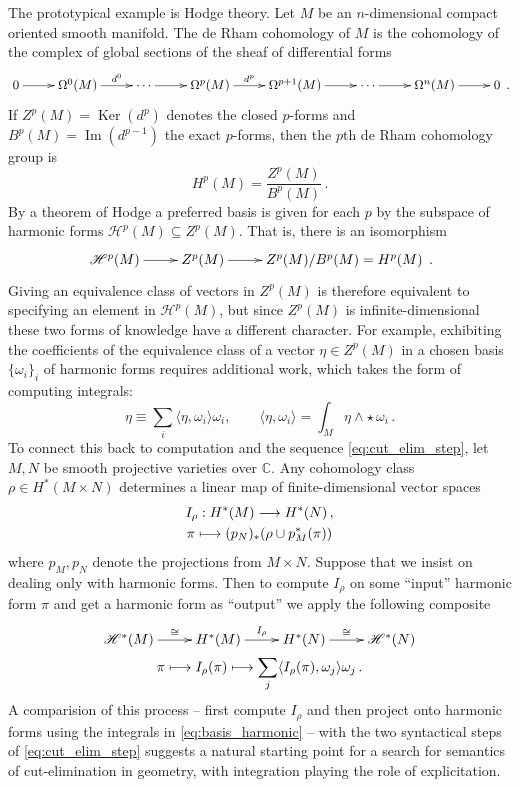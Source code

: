 \documentclass[english,letter paper,12pt,reqno]{article}
\theoremstyle{example}
\numberwithin{equation}{section}
\def\Ker{\operatorname{Ker}}
\def\im{\operatorname{Im}}
\begin{document}
The prototypical example is Hodge theory. Let $M$ be an $n$-dimensional compact oriented smooth manifold. The de Rham cohomology of $M$ \cite{bott} is the cohomology of the complex of global sections of the sheaf of differential forms
\[
\xymatrix{
0 \ar[r] & \Omega^0(M) \ar[r]^-{d^0} & \cdots \ar[r] & \Omega^p(M) \ar[r]^-{d^p} & \Omega^{p+1}(M) \ar[r] & \cdots \ar[r] & \Omega^n(M) \ar[r] & 0
}\,.
\]
If $Z^p(M) = \Ker(d^p)$ denotes the closed $p$-forms and $B^p(M) = \im(d^{p-1})$ the exact $p$-forms, then the $p$th de Rham cohomology group is
\[
H^p(M) = \frac{Z^p(M)}{B^p(M)}\,.
\]
By a theorem of Hodge a preferred basis is given for each $p$ by the subspace of harmonic forms $\mathscr{H}^p(M) \subseteq Z^p(M)$. That is, there is an isomorphism
\[
\xymatrix{
\mathscr{H}^p(M) \ar[r] & Z^p(M) \ar[r] & Z^p(M)/B^p(M) = H^p(M)
}\,.
\]
Giving an equivalence class of vectors in $Z^p(M)$ is therefore equivalent to specifying an element in $\mathscr{H}^p(M)$, but since $Z^p(M)$ is infinite-dimensional these two forms of knowledge have a different character. For example, exhibiting the coefficients of the equivalence class of a vector $\eta \in Z^p(M)$ in a chosen basis $\{ \omega_i \}_i$ of harmonic forms requires additional work, which takes the form of computing integrals:
\begin{equation}\label{eq:basis_harmonic}
\eta \equiv \sum_i \langle \eta, \omega_i \rangle \omega_i, \qquad \langle \eta, \omega_i \rangle = \int_M \eta \wedge \star\, \omega_i\,.
\end{equation}
To connect this back to computation and the sequence \eqref{eq:cut_elim_step}, let $M,N$ be smooth projective varieties over $\mathbb{C}$. Any cohomology class $\rho \in H^*(M \times N)$ determines a linear map of finite-dimensional vector spaces
\begin{gather*}
I_\rho: H^*(M) \longrightarrow H^*(N)\,,\\
\pi \longmapsto (p_N)_*( \rho \cup p_M^*(\pi) )
\end{gather*}
where $p_M, p_N$ denote the projections from $M \times N$. Suppose that we insist on dealing only with harmonic forms. Then to compute $I_\rho$ on some ``input'' harmonic form $\pi$ and get a harmonic form as ``output'' we apply the following composite
\begin{gather*}
\xymatrix{
\mathscr{H}^*(M) \ar[r]^-{\cong} & H^*(M) \ar[r]^-{I_\rho} & H^*(N) \ar[r]^-{\cong} & \mathscr{H}^*(N)
}\\
\pi \longmapsto I_\rho(\pi) \longmapsto \sum_j \langle I_\rho(\pi), \omega_j \rangle \omega_j\,.
\end{gather*}
A comparision of this process -- first compute $I_\rho$ and then project onto harmonic forms using the integrals in \eqref{eq:basis_harmonic} -- with the two syntactical steps of \eqref{eq:cut_elim_step} suggests a natural starting point for a search for semantics of cut-elimination in geometry, with integration playing the role of explicitation.
\\
\end{document}
